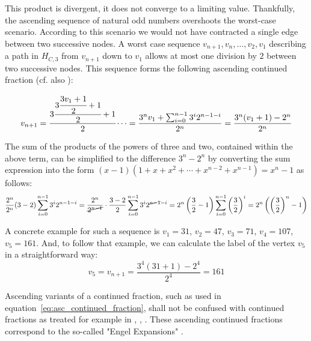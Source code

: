

\par\medskip
This product is divergent, it does not converge to a limiting value. Thankfully, the ascending sequence of natural odd numbers overshoots the worst-case scenario. According to this scenario we would not have contracted a single edge between two successive nodes. A worst case sequence $v_{n+1},v_n,\ldots,v_2,v_1$ describing a path in $H_{C,3}$ from $v_{n+1}$ down to $v_1$ allows at most one division by $2$ between two successive nodes. This sequence forms the following ascending continued fraction (cf. also \cite[p.~11]{Ref_Laarhoven}):

\begin{equation}
\label{eq:asc_continued_fraction}
	v_{n+1}=\cfrac{3\cfrac{3\cfrac{3v_1+1}{2}+1}{2}+1}{2}\dotsb
	=\frac{3^nv_1+\sum_{i=0}^{n-1}3^i2^{n-1-i}}{2^n}
	=\frac{3^n(v_1+1)-2^n}{2^n}
\end{equation}

\par\medskip
The sum of the products of the powers of three and two, contained within the above term, can be simplified to the difference $3^n-2^n$ by converting the sum expression into the form $(x-1)(1+x+x^2+\cdots+x^{n-2}+x^{n-1})=x^n-1$ as follows:
\[
\frac{2^n}{2^n}(3-2)\sum_{i=0}^{n-1}3^i2^{n-1-i}
=\frac{2^n}{\cancel{2^{n-1}}}\cdot\frac{3-2}{2}\sum_{i=0}^{n-1}3^i2^{\cancel{n-1}-i}
=2^n\left(\frac{3}{2}-1\right)\sum_{i=0}^{n-1}\left(\frac{3}{2}\right)^i
=2^n\left(\left(\frac{3}{2}\right)^n-1\right)
\]

\begin{example}
A concrete example for such a sequence is $v_1=31$, $v_2=47$, $v_3=71$, $v_4=107$, $v_5=161$. And, to follow that example, we can calculate the label of the vertex $v_5$ in a straightforward way:
\[
v_5=v_{n+1}=\frac{3^4(31+1)-2^4}{2^4}=161
\]
\end{example}

\begin{remark}
Ascending variants of a continued fraction, such as used in equation~\ref{eq:asc_continued_fraction}, shall not be confused with continued fractions as treated for example in \cite{Ref_Moore}, \cite{Ref_Hensley}, \cite{Ref_Borwe_etal}. These ascending continued fractions correspond to the so-called "Engel Expansions" \cite{Ref_Kraaikamp_Wu}.
\end{remark}

